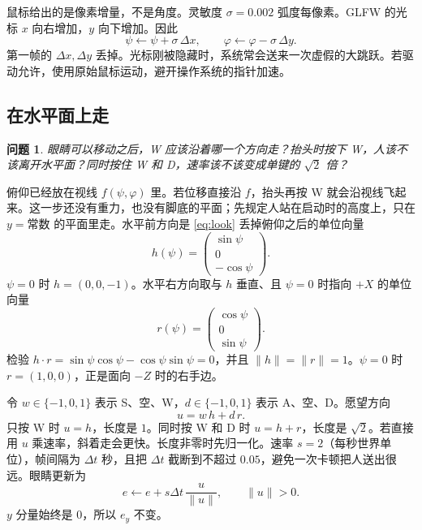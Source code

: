\documentclass[12pt,a4paper]{article}
\theoremstyle{definition}
\theoremstyle{plain}
\newtheorem{problem}{问题}[section]
\theoremstyle{remark}
\begin{document}
鼠标给出的是像素增量，不是角度。灵敏度 $\sigma=0.002$ 弧度每像素。GLFW 的光标 $x$ 向右增加，$y$ 向下增加。因此
\[
\psi\leftarrow\psi+\sigma\,\Delta x,\qquad
\varphi\leftarrow\varphi-\sigma\,\Delta y.
\]
第一帧的 $\Delta x,\Delta y$ 丢掉。光标刚被隐藏时，系统常会送来一次虚假的大跳跃。若驱动允许，使用原始鼠标运动，避开操作系统的指针加速。

\subsection{在水平面上走}

\begin{problem}
眼睛可以移动之后，W 应该沿着哪一个方向走？抬头时按下 W，人该不该离开水平面？同时按住 W 和 D，速率该不该变成单键的 $\sqrt{2}$ 倍？
\end{problem}

俯仰已经放在视线 $f(\psi,\varphi)$ 里。若位移直接沿 $f$，抬头再按 W 就会沿视线飞起来。这一步还没有重力，也没有脚底的平面；先规定人站在启动时的高度上，只在 $y=\text{常数}$ 的平面里走。水平前方向是 \eqref{eq:look} 丢掉俯仰之后的单位向量
\begin{equation}
h(\psi)=\begin{pmatrix}\sin\psi\\ 0\\ -\cos\psi\end{pmatrix}.
\label{eq:walk-forward}
\end{equation}
$\psi=0$ 时 $h=(0,0,-1)$。水平右方向取与 $h$ 垂直、且 $\psi=0$ 时指向 $+X$ 的单位向量
\begin{equation}
r(\psi)=\begin{pmatrix}\cos\psi\\ 0\\ \sin\psi\end{pmatrix}.
\label{eq:walk-right}
\end{equation}
检验 $h\cdot r=\sin\psi\cos\psi-\cos\psi\sin\psi=0$，并且 $\lVert h\rVert=\lVert r\rVert=1$。$\psi=0$ 时 $r=(1,0,0)$，正是面向 $-Z$ 时的右手边。

令 $w\in\{-1,0,1\}$ 表示 S、空、W，$d\in\{-1,0,1\}$ 表示 A、空、D。愿望方向
\[
u=w\,h+d\,r.
\]
只按 W 时 $u=h$，长度是 $1$。同时按 W 和 D 时 $u=h+r$，长度是 $\sqrt{2}$。若直接用 $u$ 乘速率，斜着走会更快。长度非零时先归一化。速率 $s=2$（每秒世界单位），帧间隔为 $\Delta t$ 秒，且把 $\Delta t$ 截断到不超过 $0.05$，避免一次卡顿把人送出很远。眼睛更新为
\begin{equation}
e\leftarrow e+s\Delta t\,\frac{u}{\lVert u\rVert},\qquad \lVert u\rVert>0.
\label{eq:walk}
\end{equation}
$y$ 分量始终是 $0$，所以 $e_y$ 不变。
\end{document}
